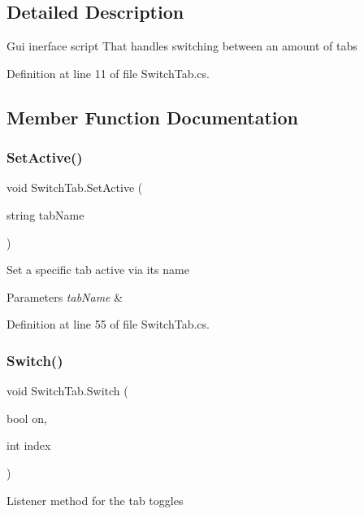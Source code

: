 \subsection{Detailed Description}
Gui inerface script That handles switching between an amount of tabs 



Definition at line 11 of file Switch\+Tab.\+cs.



\subsection{Member Function Documentation}
\mbox{\label{class_switch_tab_a96d402a75936bcc5b55c4b29bb85af29}} 
\subsubsection{Set\+Active()}
{\footnotesize\ttfamily void Switch\+Tab.\+Set\+Active (\begin{DoxyParamCaption}\item[{string}]{tab\+Name }\end{DoxyParamCaption})}



Set a specific tab active via its name 


\begin{DoxyParams}{Parameters}
{\em tab\+Name} & \\
\hline
\end{DoxyParams}


Definition at line 55 of file Switch\+Tab.\+cs.

\mbox{\label{class_switch_tab_a1073b4f2318deabba6b4e194d2273215}} 
\subsubsection{Switch()}
{\footnotesize\ttfamily void Switch\+Tab.\+Switch (\begin{DoxyParamCaption}\item[{bool}]{on,  }\item[{int}]{index }\end{DoxyParamCaption})}



Listener method for the tab toggles 



